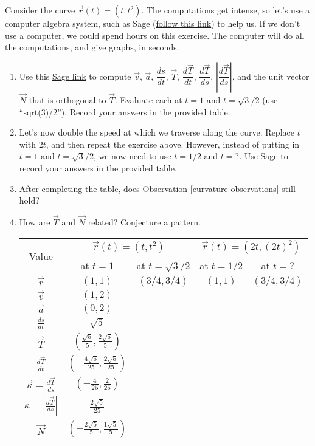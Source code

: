 \begin{problem}
 Consider the curve $\vec r(t) = (t, t^2)$. The computations get intense, so let's use a computer algebra system, such as Sage (\href{\sageurlforcurvature}{follow this link}) to help us. If we don't use a computer, we could spend hours on this exercise. The computer will do all the computations, and give graphs, in seconds.
\begin{enumerate}
 \item Use this \href{\sageurlforcurvature}{Sage link} to compute $\vec v$, $\vec a$, $\dfrac{ds}{dt}$, $\vec T$, $\dfrac{d\vec T}{dt}$, $\dfrac{d\vec T}{ds}$, $\left|\dfrac{d\vec T}{ds}\right|$, and the unit vector $\vec N$ that is orthogonal to $\vec T$. Evaluate each at $t=1$ and $t=\sqrt{3}/2$ (use ``sqrt(3)/2''). Record your answers in the provided table.
 \item Let's now double the speed at which we traverse along the curve. Replace $t$ with $2t$, and then repeat the exercise above. However, instead of putting in $t=1$ and $t=\sqrt{3}/2$, we now need to use $t=1/2$ and $t=?$. Use Sage to record your answers in the provided table.
 \item After completing the table, does Observation \ref{curvature observations} still hold?
 \item How are $\vec T$ and $\vec N$ related?  Conjecture a pattern.
\vspace*{-0.5cm}
\begin{center}
 \begin{tabular}{|c|c|c|c|c|}\hline
  \multirow{2}{*}{Value}&\multicolumn{2}{|c|}{$\vec r(t)=(t,t^2)$}&\multicolumn{2}{|c|}{$\vec r(t)=(2t,(2t)^2)$}\\
  &\quad \quad at $t=1$ \quad \quad & \quad at $t=\sqrt3/2$\quad \quad &\quad \quad at $t=1/2$\quad \quad  & \quad at $t=?$\quad\quad\quad \quad \\\hline
  $\vec r$   & $(1,1)$ & $(3/4,3/4)$ & $(1,1)$ & $(3/4,3/4)$ \\\hline
  $\vec v$   & $(1,2)$& & & \\\hline
  $\vec a$   & $(0,2)$& & & \\\hline
  $\frac{ds}{dt} $    &$\sqrt{5}$ & & & \\\hline
  $\vec T$   & $(\frac{\sqrt{5}}{5},\frac{2\sqrt{5}}{5})$ & & & \\\hline
  $\frac{d\vec T}{dt} $    &$(-\frac{4\sqrt{5}}{25},\frac{2\sqrt{5}}{25})$ & & & \\\hline
  $\vec\kappa=\frac{d\vec T}{ds} $   & $(-\frac{4}{25},\frac{2}{25})$& & & \\\hline
  $\kappa=\left|\frac{d\vec T}{ds}\right| $   &$\frac{2\sqrt{5}}{25}$ & & & \\\hline
  $\vec N$   &$(-\frac{2\sqrt{5}}{5},\frac{1\sqrt{5}}{5})$ & & & \\\hline
 \end{tabular}
 
\end{center}
\end{enumerate}
\end{problem}

